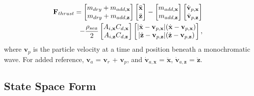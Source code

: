 \documentclass[letterpaper, 10 pt, conferences]{IEEEconf}  %
\DeclarePairedDelimiter\abs{\lvert}{\rvert}%
\renewcommand{\vec}[1]{\mathbf{#1}}
\begin{document}
\begin{equation}
\begin{split}
\vec{F}_{thrust} = \begin{bmatrix} m_{dry}+m_{add,\vec{x}} \\ m_{dry}+m_{add,\vec{z}} \end{bmatrix} \begin{bmatrix} \ddot{\vec{x}} \\ \ddot{\vec{z}} \end{bmatrix} - \begin{bmatrix} m_{add,\vec{x}} \\ m_{add,\vec{z}} \end{bmatrix} \begin{bmatrix} \dot{\vec{v}}_{p,\vec{x}} \\ \dot{\vec{v}}_{p,\vec{z}} \end{bmatrix} \\- \frac{\rho_{sea}}{2} \begin{bmatrix} A_{i,\vec{x}}C_{d,\vec{x}} \\ A_{i,\vec{z}}C_{d,\vec{z}} \end{bmatrix} \begin{bmatrix} \abs{\dot{\vec{x}}-\vec{v}_{p,\vec{x}}} (\dot{\vec{x}}-\vec{v}_{p,\vec{x}}) \\ \abs{\dot{\vec{z}}-\vec{v}_{p,\vec{z}}} (\dot{\vec{z}}-\vec{v}_{p,\vec{z}}) \end{bmatrix},
\label{eqn:forceBal3}
\end{split}
\end{equation}
where $\vec{v}_p$ is the particle velocity at a time and position beneath a monochromatic wave. For added reference, $\vec{v}_a$ = $\vec{v}_r$ + $\vec{v}_p$, and $\dot{\vec{v}}_{a,\vec{x}}$ = $\ddot{\vec{x}}$, $\dot{\vec{v}}_{a,\vec{z}}$ = $\ddot{\vec{z}}$.

\subsection{State Space Form}
\end{document}
